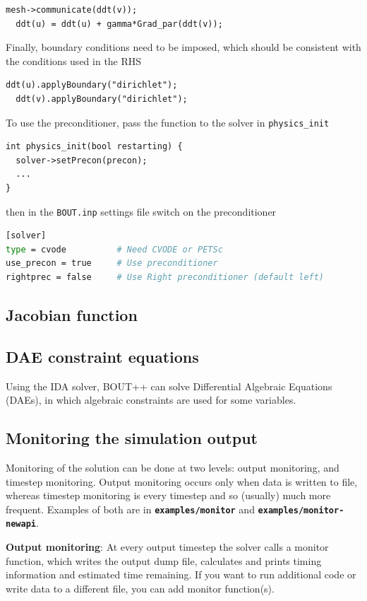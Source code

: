 \documentclass[12pt]{article}
\newcommand{\file}[1]{\texttt{\bf #1}}
\begin{document}
%
\begin{lstlisting}[numbers=none]
  mesh->communicate(ddt(v));
  ddt(u) = ddt(u) + gamma*Grad_par(ddt(v));
\end{lstlisting}
%
Finally, boundary conditions need to be imposed, which should be consistent
with the conditions used in the RHS
%
\begin{lstlisting}[numbers=none]
  ddt(u).applyBoundary("dirichlet");
  ddt(v).applyBoundary("dirichlet");
\end{lstlisting}
%
To use the preconditioner, pass the function to the solver in
%
\lstinline!physics_init!
%
\begin{lstlisting}
int physics_init(bool restarting) {
  solver->setPrecon(precon);
  ...
}
\end{lstlisting}
%
then in the \texttt{BOUT.inp} settings file switch on the preconditioner
%
\begin{lstlisting}[language=bash,numbers=none]
[solver]
type = cvode          # Need CVODE or PETSc
use_precon = true     # Use preconditioner
rightprec = false     # Use Right preconditioner (default left)
\end{lstlisting}
%



\subsection{Jacobian function}
%



\subsection{DAE constraint equations}
%
Using the IDA solver, BOUT++ can solve Differential Algebraic Equations (DAEs),
in which algebraic constraints are used for some variables.



\subsection{Monitoring the simulation output}
%
Monitoring of the solution can be done at two levels: output monitoring, and
timestep monitoring. Output monitoring occurs only when data is written to
file, whereas timestep monitoring is every timestep and so (usually) much more
frequent. Examples of both are in \file{examples/monitor} and
\file{examples/monitor-newapi}.

{\bf Output monitoring}: At every output timestep the solver calls a monitor
function, which writes the output dump file, calculates and prints timing
information and estimated time remaining. If you want to run additional code or
write data to a different file, you can add monitor function(s).
\end{document}
